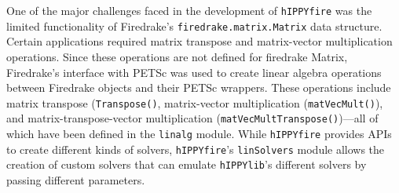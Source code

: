 \begin{itemize}
    One of the major challenges faced in the development of \texttt{hIPPYfire} was the limited functionality of Firedrake's \texttt{firedrake.matrix.Matrix} data structure. Certain applications required matrix transpose and matrix-vector multiplication operations. Since these operations are not defined for firedrake Matrix, Firedrake's interface with PETSc was used to create linear algebra operations between Firedrake objects and their PETSc wrappers. These operations include matrix transpose (\texttt{Transpose()}, matrix-vector multiplication (\texttt{matVecMult()}), and matrix-transpose-vector multiplication (\texttt{matVecMultTranspose()})---all of which have been defined in the \texttt{linalg} module. While \texttt{hIPPYfire} provides APIs to create different kinds of solvers, \texttt{hIPPYfire}'s \texttt{linSolvers} module allows the creation of custom solvers that can emulate \texttt{hIPPYlib}'s different solvers by passing different parameters.
\end{itemize}